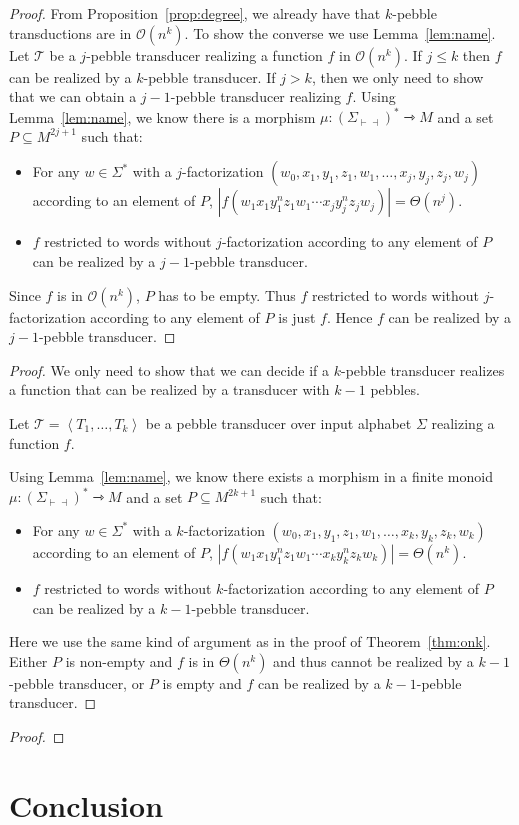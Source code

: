 \documentclass{article}
\newcommand{\atuple}[1]{\left\langle #1 \right\rangle}
\newcommand{\mright}{\rightarrowtriangle}
\newcommand{\Tt}{\mathcal T}
\newcommand{\Oo}{\mathcal O}
\theoremstyle{definition}
\theoremstyle{remark}
\begin{document}
\begin{proof}
    From Proposition~\ref{prop:degree}, we already have that $k$-pebble transductions are in $\Oo(n^k)$.
    To show the converse we use Lemma~\ref{lem:name}.
    Let $\Tt$ be a $j$-pebble transducer realizing a function $f$ in $\Oo(n^k)$.
    If $j\leq k$ then $f$ can be realized by a $k$-pebble transducer. If $j>k$, then we only need to show that we can obtain a $j-1$-pebble transducer realizing $f$. Using Lemma~\ref{lem:name}, we know there is a morphism $\mu:(\Sigma_{\vdash\dashv})^*\mright M$ and a set $P\subseteq M^{2j+1}$ such that:
    \begin{itemize}
    \item For any $w\in \Sigma^*$ with a $j$-factorization 
    $(w_0,x_{1},y_1,z_1,w_1,\ldots,x_j,y_j,z_j, w_j)$ according to an element of $P$, $|f(w_1x_1y_{1}^nz_1w_1\cdots x_jy_j^nz_jw_j)|=\Theta(n^j)$.
    \item $f$ restricted to words without $j$-factorization according to any element of $P$ can be realized by a $j{-}1$-pebble transducer.
    \end{itemize}
    Since $f$ is in $\Oo(n^k)$, $P$ has to be empty. Thus $f$ restricted to words without $j$-factorization according to any element of $P$ is just $f$. Hence $f$ can be realized by a $j-1$-pebble transducer.

\end{proof}



\minthm*

\begin{proof}
    We only need to show that we can decide if a $k$-pebble transducer realizes a function that can be realized by a transducer with $k-1$ pebbles.

    Let $\Tt=\atuple{T_1,\ldots,T_k}$ be a pebble transducer over input alphabet $\Sigma$ realizing a function $f$.

    Using Lemma~\ref{lem:name}, we know there exists a morphism in a finite monoid $\mu:(\Sigma_{\vdash\dashv})^*\mright M$ and a set $P\subseteq M^{2k+1}$ such that:
    \begin{itemize}
    \item For any $w\in \Sigma^*$ with a $k$-factorization 
    $(w_0,x_{1},y_1,z_1,w_1,\ldots,x_k,y_k,z_k, w_k)$ according to an element of $P$, $|f(w_1x_1y_{1}^nz_1w_1\cdots x_ky_k^nz_kw_k)|=\Theta(n^k)$.
    \item $f$ restricted to words without $k$-factorization according to any element of $P$ can be realized by a $k{-}1$-pebble transducer.
    \end{itemize}
    Here we use the same kind of argument as in the proof of Theorem~\ref{thm:onk}. Either $P$ is non-empty and $f$ is in $\Theta(n^k)$ and thus cannot be realized by a $k{-}1$-pebble transducer, or $P$ is empty and $f$ can be realized by a $k{-}1$-pebble transducer.
\end{proof}


\msothm*

\begin{proof}
\end{proof}



\section*{Conclusion}




\end{document}
